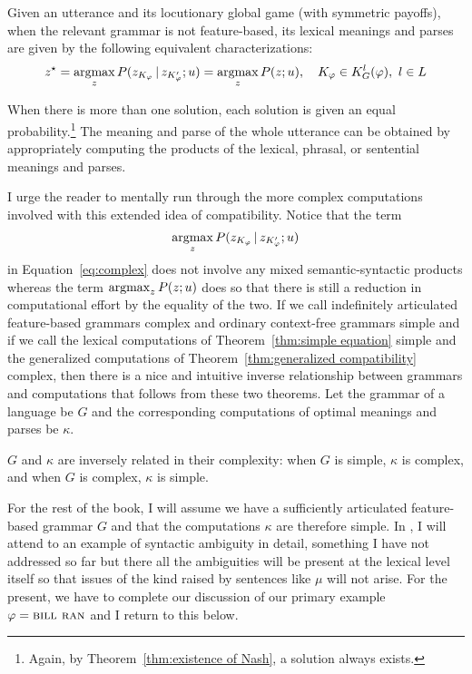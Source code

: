 \begin{theorem}\label{thm:generalized compatibility}
Given an utterance and its locutionary global game (with symmetric payoffs), when the relevant grammar is not feature-based, its lexical meanings and parses are given by the following equivalent characterizations:
\begin{equation}
z^\star = \operatorname*{argmax}_{z} P(z_{K_\varphi} \,|\, z_{K_\varphi^\prime}; u) = \operatorname*{argmax}_{z} P(z; u), \quad K_\varphi \in K^l_G(\varphi),\ l \in L
\label{eq:complex}
\end{equation}

\noindent When there is more than one solution, each solution is given an equal probability.\footnote{Again, by Theorem~\ref{thm:existence of Nash}, a solution always exists.} The meaning and parse of the whole utterance can be obtained by appropriately computing the products of the lexical, phrasal, or sentential meanings and parses.
\end{theorem}

\noindent I urge the reader to mentally run through the more complex computations involved with this extended idea of compatibility. Notice that the term \[\operatorname*{argmax}_z P(z_{K_\varphi} \,|\, z_{K_\varphi^\prime}; u)\] in Equation~\ref{eq:complex} does not involve any mixed semantic-syntactic products whereas the term $\operatorname*{argmax}_{z} P(z; u)$ does so that there is still a reduction in computational effort by the equality of the two. If we call indefinitely articulated feature-based grammars complex and ordinary context-free grammars simple and if we call the lexical computations of Theorem~\ref{thm:simple equation} simple and the generalized computations of Theorem~\ref{thm:generalized compatibility} complex, then there is a nice and intuitive inverse relationship between grammars and computations that follows from these two theorems. Let the grammar of a language be $G$ and the corresponding computations of optimal meanings and parses be $\kappa$.

\begin{theorem}
$G$ and $\kappa$ are inversely related in their complexity: when $G$ is simple, $\kappa$ is complex, and when $G$ is complex, $\kappa$ is simple.
\end{theorem}

For the rest of the book, I will assume we have a sufficiently articulated feature-based grammar $G$ and that the computations $\kappa$ are therefore simple. In , I will attend to an example of syntactic ambiguity in detail, something I have not addressed so far but there all the ambiguities will be present at the lexical level itself so that issues of the kind raised by sentences like $\mu$ will not arise. For the present, we have to complete our discussion of our primary example $\varphi = \Expression{bill ran}$ and I return to this below.



